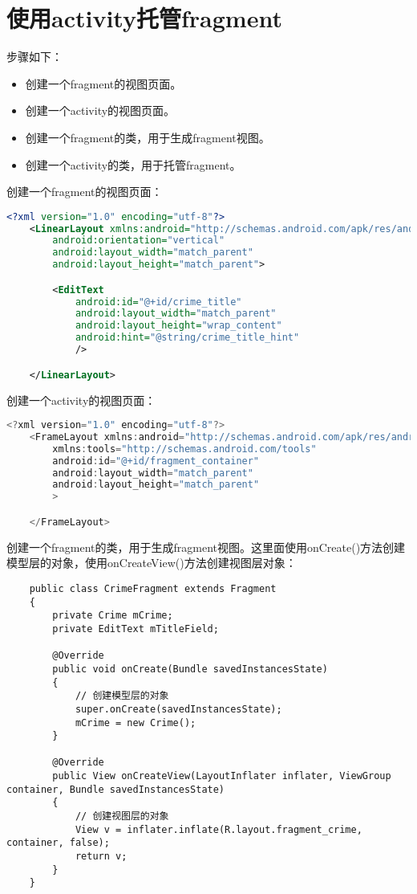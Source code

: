 \documentclass[a4paper,left=2.5cm,right=2.5cm,11pt]{article}
\begin{document}


\section{使用activity托管fragment}
	步骤如下：
	\begin{itemize}
		\item 创建一个fragment的视图页面。
		\item 创建一个activity的视图页面。
		\item 创建一个fragment的类，用于生成fragment视图。
		\item 创建一个activity的类，用于托管fragment。
	\end{itemize}

	创建一个fragment的视图页面：
	\begin{lstlisting}[language = xml]
	<?xml version="1.0" encoding="utf-8"?>
	<LinearLayout xmlns:android="http://schemas.android.com/apk/res/android"
		android:orientation="vertical"
		android:layout_width="match_parent"
		android:layout_height="match_parent">

		<EditText
			android:id="@+id/crime_title"
			android:layout_width="match_parent"
			android:layout_height="wrap_content"
			android:hint="@string/crime_title_hint"
			/>

	</LinearLayout>
	\end{lstlisting}

	创建一个activity的视图页面：
	\begin{lstlisting}[language = java]
	<?xml version="1.0" encoding="utf-8"?>
	<FrameLayout xmlns:android="http://schemas.android.com/apk/res/android"
		xmlns:tools="http://schemas.android.com/tools"
		android:id="@+id/fragment_container"
		android:layout_width="match_parent"
		android:layout_height="match_parent"
		>

	</FrameLayout>
	\end{lstlisting}

	创建一个fragment的类，用于生成fragment视图。这里面使用onCreate()方法创建模型层的对象，使用onCreateView()方法创建视图层对象：
	\begin{lstlisting}
	public class CrimeFragment extends Fragment
	{
		private Crime mCrime;
		private EditText mTitleField;

		@Override
		public void onCreate(Bundle savedInstancesState)
		{
			// 创建模型层的对象
			super.onCreate(savedInstancesState);
			mCrime = new Crime();
		}

		@Override
		public View onCreateView(LayoutInflater inflater, ViewGroup container, Bundle savedInstancesState)
		{
			// 创建视图层的对象
			View v = inflater.inflate(R.layout.fragment_crime, container, false);
			return v;
		}
	}
	\end{lstlisting}
\end{document}
